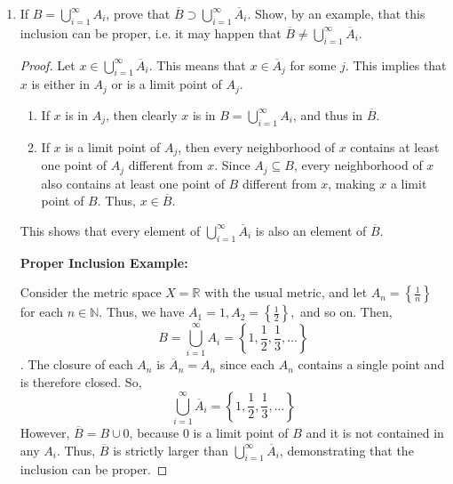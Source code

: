 \documentclass[10pt]{article}
\newenvironment{problem}[2][Problem]{\begin{trivlist}
\item[\hskip \labelsep {\bfseries #1}\hskip \labelsep {\bfseries #2.}]}{\end{trivlist}}
\begin{document}
\begin{problem}{3}
\begin{enumerate}
\begin{proof}
                This shows that every element of $\overline{B}_n$ is also an element of $\bigcup_{i=1}^n \overline{A}_i$.
            \end{proof}
		\item If $B = \bigcup_{i=1}^\infty A_i$, prove that $\overline{B} \supset \bigcup_{i=1}^\infty \overline{A}_i$.
		Show, by an example, that this inclusion can be proper, i.e. it may happen that $\overline{B} \neq \bigcup_{i=1}^\infty \overline{A}_i$.
            \begin{proof}
                Let $x \in \bigcup_{i=1}^\infty \overline{A}_i$.
                This means that $x \in \overline{A}_j$ for some $j$. This implies that $x$ is either in $A_j$ or is a limit point of $A_j$.

                \begin{enumerate}
                    \item 
                        If $x$ is in $A_j$, then clearly $x$ is in $B = \bigcup_{i=1}^\infty A_i$, and thus in $\overline{B}$.
                    \item
                        If $x$ is a limit point of $A_j$, then every neighborhood of $x$ contains at least one point of $A_j$ different from $x$. Since $A_j \subseteq B$, every neighborhood of $x$ also contains at least one point of $B$ different from $x$, making $x$ a limit point of $B$. Thus, $x \in \overline{B}$.
                \end{enumerate}

                This shows that every element of $\bigcup_{i=1}^\infty \overline{A}_i$ is also an element of $\overline{B}$.

                \textbf{Proper Inclusion Example:}

                Consider the metric space $X = \mathbb{R}$ with the usual metric, and let $A_n = \left\{\frac{1}{n}\right\}$ for each $n \in \mathbb{N}$.
                Thus, we have $A_1 = {1}, A_2 = \left\{\frac{1}{2}\right\},$ and so on.
                Then, $$B = \bigcup_{i=1}^\infty A_i = \left\{1, \frac{1}{2}, \frac{1}{3}, \ldots\right\}$$.
                The closure of each $A_n$ is $\overline{A}_n = A_n$ since each $A_n$ contains a single point and is therefore closed.
                So, $$\bigcup_{i=1}^\infty \overline{A}_i = \left\{1, \frac{1}{2}, \frac{1}{3}, \dots\right\}$$
                However, $\overline{B} = B \cup {0}$, because $0$ is a limit point of $B$ and it is not contained in any $A_i$.
                Thus, $\overline{B}$ is strictly larger than $\bigcup_{i=1}^\infty \overline{A}_i$, demonstrating that the inclusion can be proper.

                
            \end{proof}
	\end{enumerate}
\end{problem}
\medskip
\end{document}
